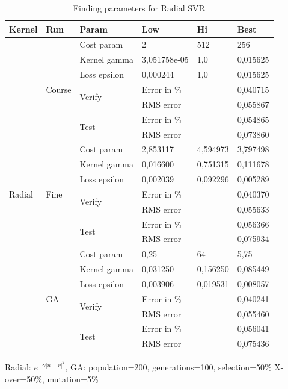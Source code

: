 \begin{table}[H]
\begin{threeparttable}
\begin{tabular}{ | l | l | l | l | l | l | } 
\hline 
Kernel & Run & Param & Low & Hi & Best \\
\hline 
\multirow{21}{*}{Radial} %
& \multirow{7}{*}{Course} & Cost param & 2 & 512 & 256 \\
& & Kernel gamma & 3,051758e-05 & 1,0 & 0,015625 \\  
& & Loss epsilon & 0,000244 & 1,0 & 0,015625 \\ 
\cline{3-6}
& & \multirow{2}{*}{Verify} & \multicolumn{2}{l|}{Error in \%} & 0,040715 \\
& & & \multicolumn{2}{l|}{RMS error} & 0,055867 \\
\cline{3-6}
& & \multirow{2}{*}{Test} & \multicolumn{2}{l|}{Error in \%} & 0,054865 \\
& & & \multicolumn{2}{l|}{RMS error} & 0,073860 \\
\cline{2-6}
& \multirow{7}{*}{Fine} & Cost param & 2,853117 & 4,594973 & 3,797498 \\
& & Kernel gamma & 0,016600 & 0,751315 & 0,111678 \\  
& & Loss epsilon & 0,002039 & 0,092296 & 0,005289 \\
\cline{3-6}
& & \multirow{2}{*}{Verify} & \multicolumn{2}{l|}{Error in \%} & 0,040370 \\
& & & \multicolumn{2}{l|}{RMS error} & 0,055633 \\
\cline{3-6}
& & \multirow{2}{*}{Test} & \multicolumn{2}{l|}{Error in \%} & 0,056366 \\
& & & \multicolumn{2}{l|}{RMS error} & 0,075934 \\
\cline{2-6}
& \multirow{7}{*}{GA} & Cost param & 0,25 & 64 & 5,75 \\
& & Kernel gamma & 0,031250  & 0,156250 & 0,085449 \\  
& & Loss epsilon & 0,003906 & 0,019531 & 0,008057 \\
\cline{3-6}
& & \multirow{2}{*}{Verify} & \multicolumn{2}{l|}{Error in \%} & 0,040241 \\
& & & \multicolumn{2}{l|}{RMS error} & 0,055460 \\
\cline{3-6}
& & \multirow{2}{*}{Test} & \multicolumn{2}{l|}{Error in \%} & 0,056041 \\
& & & \multicolumn{2}{l|}{RMS error} & 0,075436 \\
\hline
\end{tabular}
\begin{tablenotes}
      \small
      \item Radial: $e^{-\gamma|u-v|^{2}}$, GA: population=200, generations=100, selection=50\% X-over=50\%, mutation=5\%
\end{tablenotes}
\caption{Finding parameters for Radial SVR}
\label{tab:params_svr_radial}
\end{threeparttable}
\end{table}



